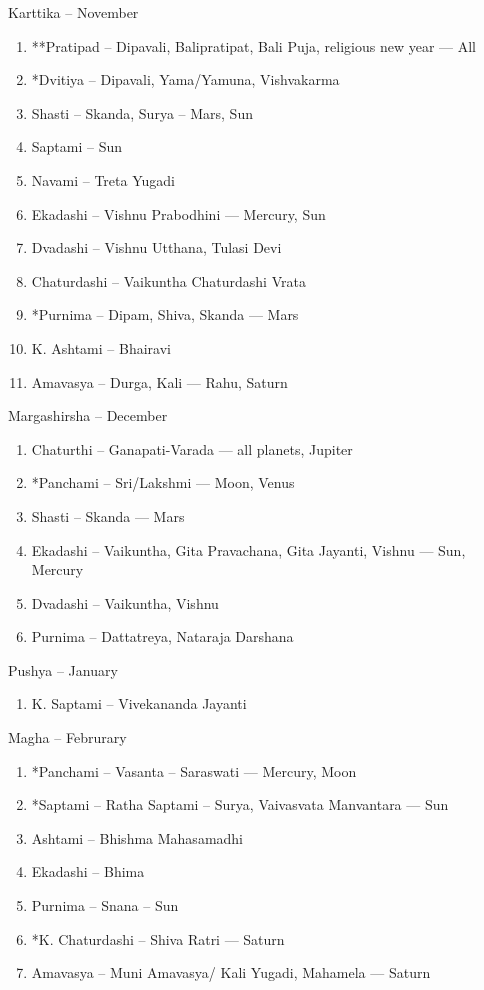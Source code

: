 \begin{enumerate}
\begin{enumerate}
Karttika – November
\begin{enumerate} 
\item[] **Pratipad – Dipavali, Balipratipat, Bali Puja, religious new year — All
\item[] *Dvitiya – Dipavali, Yama/Yamuna, Vishvakarma
\item[] Shasti – Skanda, Surya – Mars, Sun
\item[] Saptami – Sun
\item[] Navami – Treta Yugadi
\item[] Ekadashi – Vishnu Prabodhini — Mercury, Sun
\item[] Dvadashi – Vishnu Utthana, Tulasi Devi
\item[] Chaturdashi – Vaikuntha Chaturdashi Vrata
\item[] *Purnima – Dipam, Shiva, Skanda — Mars
\item[] K. Ashtami – Bhairavi
\item[] Amavasya – Durga, Kali — Rahu, Saturn
 \end{enumerate}

Margashirsha – December
\begin{enumerate} 
\item[] Chaturthi – Ganapati-Varada — all planets, Jupiter
\item[] *Panchami – Sri/Lakshmi — Moon, Venus
\item[] Shasti – Skanda — Mars
\item[] Ekadashi – Vaikuntha, Gita Pravachana, Gita Jayanti, Vishnu — Sun, Mercury
\item[] Dvadashi – Vaikuntha, Vishnu
\item[] Purnima – Dattatreya, Nataraja Darshana
 \end{enumerate}

Pushya – January
\begin{enumerate} 
\item[] K. Saptami – Vivekananda Jayanti
 \end{enumerate}

Magha – Februrary
\begin{enumerate} 
\item[] *Panchami – Vasanta – Saraswati — Mercury, Moon
\item[] *Saptami – Ratha Saptami – Surya, Vaivasvata Manvantara — Sun
\item[] Ashtami – Bhishma Mahasamadhi
\item[] Ekadashi – Bhima
\item[] Purnima – Snana – Sun
\item[] *K. Chaturdashi – Shiva Ratri — Saturn
\item[] Amavasya – Muni Amavasya/ Kali Yugadi, Mahamela — Saturn
 \end{enumerate}


\end{enumerate}
\end{enumerate}
